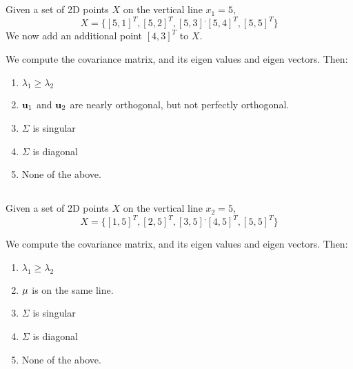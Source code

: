 \begin{frame}
\section{}
Given a set of 2D points $X$ on the vertical line $x_1=5$,
\[ X = \{ [5,1]^T, [5,2]^T, [5,3]^, [5,4]^T, [5,5]^T \}\]
We now add an additional
point $[4,3]^T$ to $X$.

We compute the covariance matrix, and its eigen values and eigen vectors. Then:


\begin{enumerate}
\item $\lambda_1 \geq \lambda_2$    %
\item ${\bf u}_1$ and ${\bf u}_2$ are nearly orthogonal, but not perfectly orthogonal.
\item  $\Sigma$ is singular
\item  $\Sigma$ is diagonal   %
\item None of the above.
\end{enumerate}
\end{frame}

\begin{frame}
\section{}
Given a set of 2D points $X$ on the vertical line $x_2=5$,
\[ X = \{ [1,5]^T, [2,5]^T, [3,5]^, [4,5]^T, [5,5]^T \}\]


We compute the covariance matrix, and its eigen values and eigen vectors. Then:


\begin{enumerate}
\item $\lambda_1 \geq \lambda_2$    %
\item ${\bf \mu}$ is on the same line.    %
\item  $\Sigma$ is singular   %
\item  $\Sigma$ is diagonal   %
\item None of the above.
\end{enumerate}
\end{frame}

